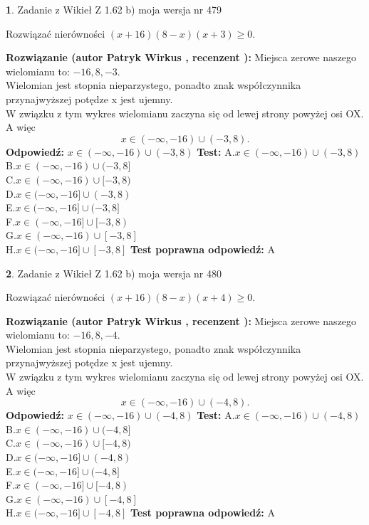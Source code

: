 \documentclass[12pt, a4paper]{article}
\theoremstyle{definition} %
\newtheorem{zad}{}
\newcommand{\zadStart}[1]{\begin{zad}#1\newline}
\newcommand{\zadStop}{\end{zad}}
\newcommand{\rozwStart}[2]{\noindent \textbf{Rozwiązanie (autor #1 , recenzent #2): }\newline}
\newcommand{\rozwStop}{\newline}
\newcommand{\odpStart}{\noindent \textbf{Odpowiedź:}\newline}
\newcommand{\odpStop}{\newline}
\newcommand{\testStart}{\noindent \textbf{Test:}\newline}
\newcommand{\testStop}{\newline}
\newcommand{\kluczStart}{\noindent \textbf{Test poprawna odpowiedź:}\newline}
\newcommand{\kluczStop}{\newline}
\begin{document}
\zadStart{Zadanie z Wikieł Z 1.62 b) moja wersja nr 479}

Rozwiązać nierówności $(x+16)(8-x)(x+3)\ge0$.
\zadStop
\rozwStart{Patryk Wirkus}{}
Miejsca zerowe naszego wielomianu to: $-16, 8, -3$.\\
Wielomian jest stopnia nieparzystego, ponadto znak współczynnika przy\linebreak najwyższej potędze x jest ujemny.\\ W związku z tym wykres wielomianu zaczyna się od lewej strony powyżej osi OX. A więc $$x \in (-\infty,-16) \cup (-3,8).$$
\rozwStop
\odpStart
$x \in (-\infty,-16) \cup (-3,8)$
\odpStop
\testStart
A.$x \in (-\infty,-16) \cup (-3,8)$\\
B.$x \in (-\infty,-16) \cup (-3,8]$\\
C.$x \in (-\infty,-16) \cup [-3,8)$\\
D.$x \in (-\infty,-16] \cup (-3,8)$\\
E.$x \in (-\infty,-16] \cup (-3,8]$\\
F.$x \in (-\infty,-16] \cup [-3,8)$\\
G.$x \in (-\infty,-16) \cup [-3,8]$\\
H.$x \in (-\infty,-16] \cup [-3,8]$
\testStop
\kluczStart
A
\kluczStop



\zadStart{Zadanie z Wikieł Z 1.62 b) moja wersja nr 480}

Rozwiązać nierówności $(x+16)(8-x)(x+4)\ge0$.
\zadStop
\rozwStart{Patryk Wirkus}{}
Miejsca zerowe naszego wielomianu to: $-16, 8, -4$.\\
Wielomian jest stopnia nieparzystego, ponadto znak współczynnika przy\linebreak najwyższej potędze x jest ujemny.\\ W związku z tym wykres wielomianu zaczyna się od lewej strony powyżej osi OX. A więc $$x \in (-\infty,-16) \cup (-4,8).$$
\rozwStop
\odpStart
$x \in (-\infty,-16) \cup (-4,8)$
\odpStop
\testStart
A.$x \in (-\infty,-16) \cup (-4,8)$\\
B.$x \in (-\infty,-16) \cup (-4,8]$\\
C.$x \in (-\infty,-16) \cup [-4,8)$\\
D.$x \in (-\infty,-16] \cup (-4,8)$\\
E.$x \in (-\infty,-16] \cup (-4,8]$\\
F.$x \in (-\infty,-16] \cup [-4,8)$\\
G.$x \in (-\infty,-16) \cup [-4,8]$\\
H.$x \in (-\infty,-16] \cup [-4,8]$
\testStop
\kluczStart
A
\kluczStop
\end{document}
